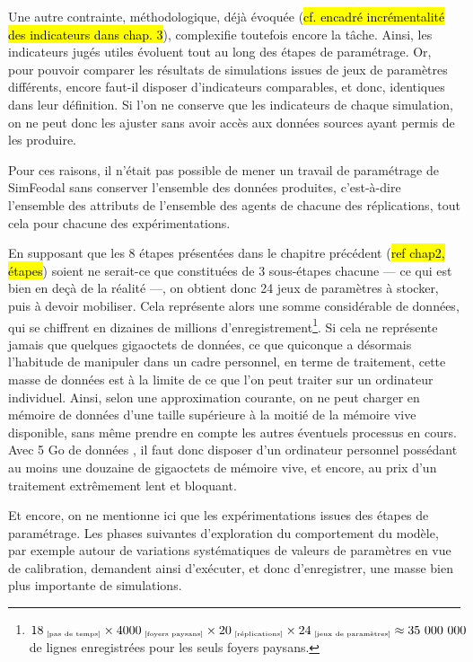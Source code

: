 	Une autre contrainte, méthodologique, déjà évoquée (\hl{cf. encadré incrémentalité des indicateurs dans chap. 3}), complexifie toutefois encore la tâche.
	Ainsi, les indicateurs jugés utiles évoluent tout au long des étapes de paramétrage.
	Or, pour pouvoir comparer les résultats de simulations issues de jeux de paramètres différents, encore faut-il disposer d'indicateurs comparables, et donc, identiques dans leur définition.
	Si l'on ne conserve que les indicateurs de chaque simulation, on ne peut donc les ajuster sans avoir accès aux données sources ayant permis de les produire.

	Pour ces raisons, il n'était pas possible de mener un travail de paramétrage de SimFeodal sans conserver l'ensemble des données produites, c'est-à-dire l'ensemble des attributs de l'ensemble des agents de chacune des réplications, tout cela pour chacune des expérimentations.

	En supposant que les 8 étapes présentées dans le chapitre précédent (\hl{ref chap2, étapes}) soient ne serait-ce que constituées de 3 sous-étapes chacune --- ce qui est bien en deçà de la réalité ---, on obtient donc 24 jeux de paramètres à stocker, puis à devoir mobiliser.
	Cela représente alors une somme considérable de données, qui se chiffrent en dizaines de millions d'enregistrement\footnote{
	$18_{\text{\tiny ~[pas de temps]}} \times 4000_{\text{\tiny ~[foyers paysans]}} \times 20_{\text{\tiny ~[réplications]}} \times 24_{\text{\tiny ~[jeux de paramètres]}} \approx 35~000~000$ de lignes enregistrées pour les seuls foyers paysans.
	}.
	Si cela ne représente jamais que quelques gigaoctets de données, ce que quiconque a désormais l'habitude de manipuler dans un cadre personnel, en terme de traitement, cette masse de données est à la limite de ce que l'on peut traiter sur un ordinateur individuel.
	Ainsi, selon une approximation courante, on ne peut charger en mémoire de données d'une taille supérieure à la moitié de la mémoire vive disponible, sans même prendre en compte les autres éventuels processus en cours.
	Avec 5 Go de données , il faut donc disposer d'un ordinateur personnel possédant au moins une douzaine de gigaoctets de mémoire vive, et encore, au prix d'un traitement extrêmement lent et bloquant.
	
	Et encore, on ne mentionne ici que les expérimentations issues des étapes de paramétrage.
	Les phases suivantes d'exploration du comportement du modèle, par exemple autour de variations systématiques de valeurs de paramètres en vue de calibration, demandent ainsi d'exécuter, et donc d'enregistrer, une masse bien plus importante de simulations.

